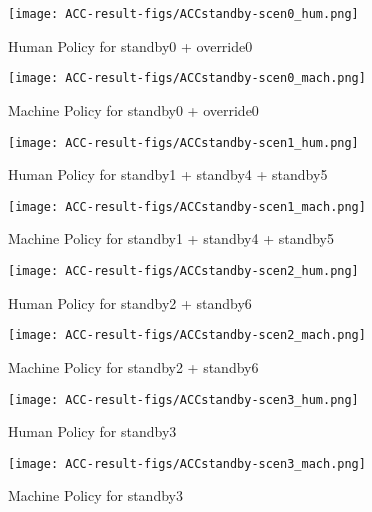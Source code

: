 \begin{figure}[h]
    \centering
    \texttt{[image: ACC-result-figs/ACCstandby-scen0\_hum.png]}
    \caption{Human Policy for standby0 + override0}
    \label{fig:standby-s0-hum}
\end{figure}

\begin{figure}[h]
    \centering
    \texttt{[image: ACC-result-figs/ACCstandby-scen0\_mach.png]}
    \caption{Machine Policy for standby0 + override0}
    \label{fig:standby-s0-mach}
\end{figure}

\begin{figure}[h]
    \centering
    \texttt{[image: ACC-result-figs/ACCstandby-scen1\_hum.png]}
    \caption{Human Policy for standby1 + standby4 + standby5}
    \label{fig:standby-s1-hum}
\end{figure}

\begin{figure}[h]
    \centering
    \texttt{[image: ACC-result-figs/ACCstandby-scen1\_mach.png]}
    \caption{Machine Policy for standby1 + standby4 + standby5}
    \label{fig:standby-s1-mach}
\end{figure}

\begin{figure}[h]
    \centering
    \texttt{[image: ACC-result-figs/ACCstandby-scen2\_hum.png]}
    \caption{Human Policy for standby2 + standby6}
    \label{fig:standby-s2-hum}
\end{figure}

\begin{figure}[h]
    \centering
    \texttt{[image: ACC-result-figs/ACCstandby-scen2\_mach.png]}
    \caption{Machine Policy for standby2 + standby6}
    \label{fig:standby-s2-mach}
\end{figure}

\begin{figure}[h]
    \centering
    \texttt{[image: ACC-result-figs/ACCstandby-scen3\_hum.png]}
    \caption{Human Policy for standby3}
    \label{fig:standby-s3-hum}
\end{figure}

\begin{figure}[h]
    \centering
    \texttt{[image: ACC-result-figs/ACCstandby-scen3\_mach.png]}
    \caption{Machine Policy for standby3}
    \label{fig:standby-s3-mach}
\end{figure}

